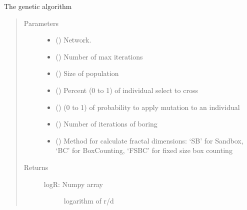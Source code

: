 \documentclass[letterpaper,10pt,english]{sphinxmanual}
\begin{document}
\begin{fulllineitems}
\label{\detokenize{Genetic:Genetic.Genetic.Genetic}}
The genetic algorithm
\begin{quote}\begin{description}
\item[{Parameters}] \leavevmode\begin{itemize}
\item {} 
 () \textendash{} Network.

\item {} 
 () \textendash{} Number of max iterations

\item {} 
 () \textendash{} Size of population

\item {} 
 () \textendash{} Percent (0 to 1) of individual select to cross

\item {} 
 () \textendash{} (0 to 1) of probability to apply mutation to an individual

\item {} 
 () \textendash{} Number of iterations of boring

\item {} 
 () \textendash{} Method for calculate fractal dimensions: ‘SB’ for Sandbox, ‘BC’ for BoxCounting, ‘FSBC’ for fixed size box counting

\end{itemize}

\item[{Returns}] \leavevmode
\begin{description}
\item[{logR: Numpy array}] \leavevmode
logarithm of r/d


\end{description}
\end{description}
\end{quote}
\end{fulllineitems}
\end{document}
